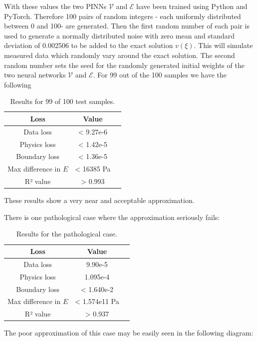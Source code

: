 \documentclass[a4paper,11pt]{article}
\begin{document}
With these values the two PINNs $\mathscr{V}$ and $\mathscr{E} $ have been trained using Python and PyTorch. Therefore 100 pairs of random integers - each uniformly distributed between 0 and 100- are generated. Then the first random number of each pair is used to generate a normally distributed noise with zero mean and standard deviation of 0.002506 to be added to the exact solution $v(\xi ) $. This will simulate measured data which randomly vary around the exact solution. The second random number sets the seed for the randomly generated initial weights of the two neural networks $\mathscr{V}$ and $\mathscr{E} $.
For 99 out of the 100 samples we have the following 
\begin{table}[h!]
\centering
\begin{tabular}{ccl}
\toprule
\textbf{Loss} & \textbf{Value}\\
\midrule
Data loss & < 9.27e-6\\
Physics loss & < 1.42e-5\\
Boundary loss & < 1.36e-5 \\
Max difference in $E $ & < 16385 Pa \\
R² value & > 0.993 \\
\bottomrule
\end{tabular}
\caption{Results for 99 of 100 test samples.}
\end{table}
These results show a very near and acceptable approximation.

There is one pathological case where the approximation seriously fails:
\begin{table}[h!]
\centering
\begin{tabular}{ccl}
\toprule
\textbf{Loss} & \textbf{Value}\\
\midrule
Data loss & 9.90e-5\\
Physics loss & 1.095e-4 \\
Boundary loss & < 1.640e-2 \\
Max difference in $E $ & < 1.574e11 Pa \\
R² value & > 0.937 \\
\bottomrule
\end{tabular}
\caption{Results for the pathological case.}
\end{table}
The poor approximation of this case may be easily seen in the following diagram:
\end{document}
